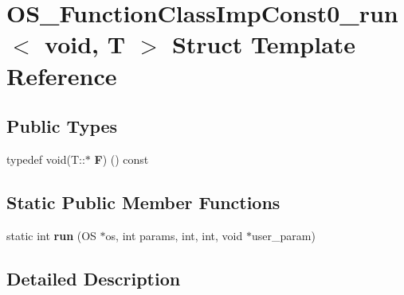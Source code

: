\hypertarget{struct_o_s___function_class_imp_const0__run_3_01void_00_01_t_01_01_01_01_01_01_01_01_01_01_01_01185009479e0a99a8253d1097ed96d746}{}\section{O\+S\+\_\+\+Function\+Class\+Imp\+Const0\+\_\+run$<$ void, T $>$ Struct Template Reference}
\label{struct_o_s___function_class_imp_const0__run_3_01void_00_01_t_01_01_01_01_01_01_01_01_01_01_01_01185009479e0a99a8253d1097ed96d746}
\subsection*{Public Types}
\begin{DoxyCompactItemize}
\item 
typedef void(T\+::$\ast$ {\bfseries F}) () const \hypertarget{struct_o_s___function_class_imp_const0__run_3_01void_00_01_t_01_01_01_01_01_01_01_01_01_01_01_01185009479e0a99a8253d1097ed96d746_a30a434b1f2912581c0c3a3190020845c}{}\label{struct_o_s___function_class_imp_const0__run_3_01void_00_01_t_01_01_01_01_01_01_01_01_01_01_01_01185009479e0a99a8253d1097ed96d746_a30a434b1f2912581c0c3a3190020845c}

\end{DoxyCompactItemize}
\subsection*{Static Public Member Functions}
\begin{DoxyCompactItemize}
\item 
static int {\bfseries run} (OS $\ast$os, int params, int, int, void $\ast$user\+\_\+param)\hypertarget{struct_o_s___function_class_imp_const0__run_3_01void_00_01_t_01_01_01_01_01_01_01_01_01_01_01_01185009479e0a99a8253d1097ed96d746_a283648848354e1848a285f09b0fc7f6b}{}\label{struct_o_s___function_class_imp_const0__run_3_01void_00_01_t_01_01_01_01_01_01_01_01_01_01_01_01185009479e0a99a8253d1097ed96d746_a283648848354e1848a285f09b0fc7f6b}

\end{DoxyCompactItemize}


\subsection{Detailed Description}
